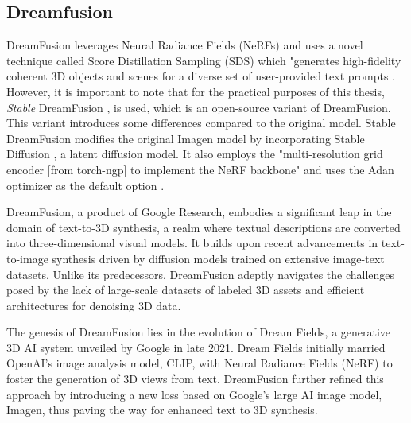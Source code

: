\subsection{Dreamfusion}\label{dreamfusion}

DreamFusion leverages Neural Radiance Fields (NeRFs) \citep{mildenhallNERF} and uses a novel technique called Score Distillation Sampling (SDS) \citep{pooleDreamfusion} which "generates high-fidelity coherent 3D objects and scenes for a diverse set of user-provided text prompts \citep{pooleDreamfusion}. However, it is important to note that for the practical purposes of this thesis, \emph{Stable} DreamFusion \citep{stable-dreamfusion}, is used,  which is an open-source variant of DreamFusion. This variant introduces some differences compared to the original model. Stable DreamFusion modifies the original Imagen model by incorporating Stable Diffusion \citep{rombachStableDiffusion}, a latent diffusion model. It also employs the "multi-resolution grid encoder [from torch-ngp] to implement the NeRF backbone" \citep{stable-dreamfusion} and uses the Adan optimizer as the default option \citep{stable-dreamfusion}.

DreamFusion, a product of Google Research, embodies a significant leap in the domain of text-to-3D synthesis, a realm where textual descriptions are converted into three-dimensional visual models. It builds upon recent advancements in text-to-image synthesis driven by diffusion models trained on extensive image-text datasets. Unlike its predecessors, DreamFusion adeptly navigates the challenges posed by the lack of large-scale datasets of labeled 3D assets and efficient architectures for denoising 3D data. 

The genesis of DreamFusion lies in the evolution of Dream Fields, a generative 3D AI system unveiled by Google in late 2021. Dream Fields initially married OpenAI's image analysis model, CLIP, with Neural Radiance Fields (NeRF) to foster the generation of 3D views from text. DreamFusion further refined this approach by introducing a new loss based on Google's large AI image model, Imagen, thus paving the way for enhanced text to 3D synthesis.


